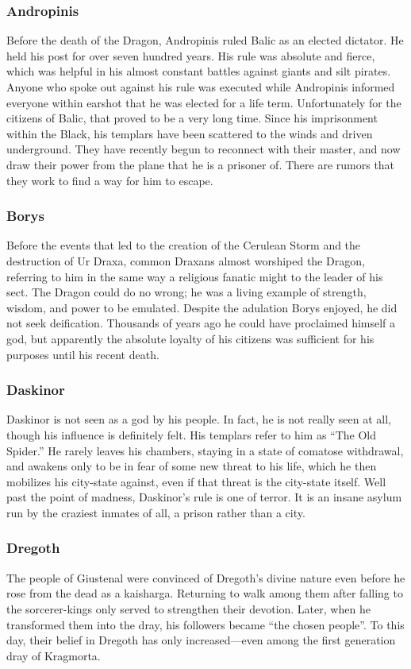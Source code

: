 \subsubsection{Andropinis}
Before the death of the Dragon, Andropinis ruled Balic as an elected dictator. He held his post for over seven hundred years. His rule was absolute and fierce, which was helpful in his almost constant battles against giants and silt pirates. Anyone who spoke out against his rule was executed while Andropinis informed everyone within earshot that he was elected for a life term. Unfortunately for the citizens of Balic, that proved to be a very long time. Since his imprisonment within the Black, his templars have been scattered to the winds and driven underground. They have recently begun to reconnect with their master, and now draw their power from the plane that he is a prisoner of. There are rumors that they work to find a way for him to escape.

\subsubsection{Borys}
Before the events that led to the creation of the Cerulean Storm and the destruction of Ur Draxa, common Draxans almost worshiped the Dragon, referring to him in the same way a religious fanatic might to the leader of his sect. The Dragon could do no wrong; he was a living example of strength, wisdom, and power to be emulated. Despite the adulation Borys enjoyed, he did not seek deification. Thousands of years ago he could have proclaimed himself a god, but apparently the absolute loyalty of his citizens was sufficient for his purposes until his recent death.

\subsubsection{Daskinor}
Daskinor is not seen as a god by his people. In fact, he is not really seen at all, though his influence is definitely felt. His templars refer to him as ``The Old Spider.'' He rarely leaves his chambers, staying in a state of comatose withdrawal, and awakens only to be in fear of some new threat to his life, which he then mobilizes his city-state against, even if that threat is the city-state itself. Well past the point of madness, Daskinor's rule is one of terror. It is an insane asylum run by the craziest inmates of all, a prison rather than a city.

\subsubsection{Dregoth}
The people of Giustenal were convinced of Dregoth's divine nature even before he rose from the dead as a kaisharga. Returning to walk among them after falling to the sorcerer-kings only served to strengthen their devotion. Later, when he transformed them into the dray, his followers became ``the chosen people''. To this day, their belief in Dregoth has only increased—even among the first generation dray of Kragmorta.

